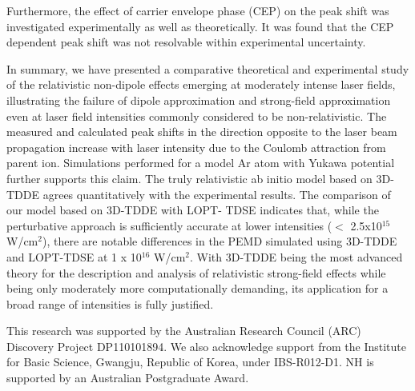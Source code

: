 \documentclass[aps,prl,twocolumn,superscriptaddress,amsmath,amssymb]{revtex4-1}
\begin{document}
Furthermore, the effect of carrier envelope phase (CEP) on the peak shift was investigated experimentally as well as theoretically. It was found that the CEP dependent  peak shift was not resolvable within experimental uncertainty.


In summary, we have presented a comparative theoretical and experimental study of the relativistic non-dipole effects emerging at moderately intense laser fields, illustrating the failure of dipole approximation and strong-field approximation even at laser field intensities commonly considered to be non-relativistic. The measured and calculated peak shifts in the direction opposite to the laser beam propagation increase with laser intensity due to the Coulomb attraction from parent ion. Simulations performed for a model Ar atom with Yukawa potential further supports this claim. The truly relativistic ab initio model based on 3D-TDDE agrees quantitatively with the experimental results. The comparison of our model based on 3D-TDDE with LOPT- TDSE indicates that, while the perturbative approach is sufficiently accurate at lower intensities ($<$ 2.5x10$^{15}$ W/cm$^{2}$), there are notable differences in the PEMD simulated using 3D-TDDE and LOPT-TDSE at 1 x 10$^{16}$ W/cm$^{2}$. With 3D-TDDE being the most advanced theory for the description and analysis of relativistic strong-field effects while being only moderately more computationally demanding, its application for a broad range of intensities is fully justified.


This research  was supported by the Australian Research Council (ARC)
Discovery Project DP110101894. We also acknowledge support from the Institute for Basic Science, Gwangju, Republic of Korea, under IBS-R012-D1. NH is supported by an Australian Postgraduate Award.

\end{document}
